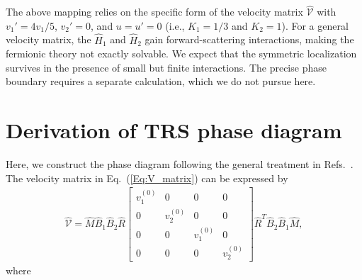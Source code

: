 \documentclass[aps,prx,amsmath,superscriptaddress,twocolumn,bibnotes,longbibliography,floatfix]{revtex4-2}
\begin{document}
	The above mapping relies on the specific form of the velocity matrix $\hat{\mathcal{V}}$ with $v_1'=4v_1/5$, $v_2'=0$, and $u=u'=0$ (i.e., $K_1=1/3$ and $K_2=1$). For a general velocity matrix, the $\hat{H}_1$ and $\hat{H}_2$ gain forward-scattering interactions, making the fermionic theory not exactly solvable. We expect that the symmetric localization survives in the presence of small but finite interactions. The precise phase boundary requires a separate calculation, which we do not pursue here.

	\section{Derivation of TRS phase diagram}\label{App:PD}



	Here, we construct the phase diagram following the general treatment in Refs.~\cite{MooreJE1998,XuC2006}. The velocity matrix in Eq.~(\ref{Eq:V_matrix}) can be expressed by
	\begin{align}
		\hat{\mathcal{V}}=\hat{M}\hat{B}_1\hat{B}_2\hat{R}\begin{bmatrix}
			v_1^{(0)} & 0 & 0 & 0\\
			0 & v_2^{(0)} & 0 & 0\\
			0 & 0 & v_1^{(0)} & 0\\
			0 & 0 & 0 & v_2^{(0)}
		\end{bmatrix}
		\hat{R}^T\hat{B}_2\hat{B}_1\hat{M},
	\end{align}
	where
\end{document}
